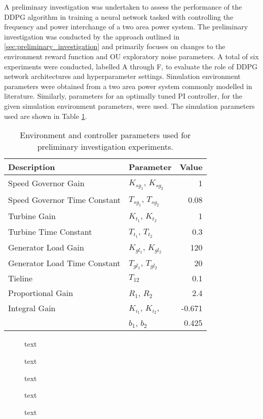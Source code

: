 A preliminary investigation was undertaken to assess the performance of the DDPG algorithm in training a neural network tasked with controlling the frequency and power interchange of a two area power system. The preliminary investigation was conducted by the approach outlined in \textsection \ref{sec:preliminary_investigation} and primarily focuses on changes to the environment reward function and OU exploratory noise parameters. A total of six experiments were conducted, labelled A through F, to evaluate the role of DDPG network architectures and hyperparameter settings. Simulation environment parameters were obtained from a two area power system commonly modelled in literature. Similarly, parameters for an optimally tuned PI controller, for the given simulation environment parameters, were used. The simulation parameters used are shown in Table \ref{tab:5000}.
\begin{table}[h]
	\centering
	\caption{Environment and controller parameters used for preliminary investigation experiments.}
	\begin{tabular}{llr}
		\toprule
		\textbf{Description} & \textbf{Parameter} & \textbf{Value} \\
		\midrule
		Speed Governor Gain & $K_{sg_1}$, $K_{sg_2}$ & 1 \\
		Speed Governor Time Constant & $T_{sg_1}$, $T_{sg_2}$ & 0.08 \\
		Turbine Gain & $K_{t_1}$, $K_{t_2}$ & 1 \\
		Turbine Time Constant & $T_{t_1}$, $T_{t_2}$ & 0.3 \\
		Generator Load Gain & $K_{gl_1}$, $K_{gl_2}$ & 120 \\
		Generator Load Time Constant & $T_{gl_1}$, $T_{gl_2}$ & 20 \\
		Tieline & $T_{12}$ & 0.1 \\
		Proportional Gain & $R_1$, $R_2$ & 2.4 \\
		Integral Gain & $K_{i_1}$, $K_{i_2}$, & -0.671 \\
		 & $b_1$, $b_2$ & 0.425 \\
		\bottomrule
	\end{tabular}\label{tab:5000}
\end{table}

\begin{figure}[h]
	\centering
	
	\caption{text}
\end{figure}

\begin{figure}[h]
	\centering
	
	
	\caption{text}
	
	\vspace*{2cm}
	
	
	\caption{text}
\end{figure}

\begin{figure}[h]
	\centering

	
	\caption{text}
	
	\vspace*{2cm}
	
	
	\caption{text}
\end{figure}